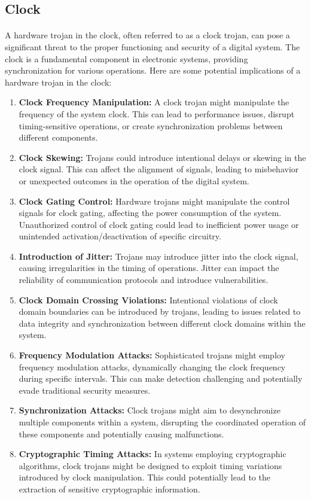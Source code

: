\subsection{Clock}
\paragraph*{}
A hardware trojan in the clock, often referred to as a clock trojan, can pose a significant threat to the proper functioning and security of a digital system. The clock is a fundamental component in electronic systems, providing synchronization for various operations. Here are some potential implications of a hardware trojan in the clock:
\begin{enumerate}
	\item \textbf{Clock Frequency Manipulation:} A clock trojan might manipulate the frequency of the system clock. This can lead to performance issues, disrupt timing-sensitive operations, or create synchronization problems between different components.
	\item \textbf{Clock Skewing:} Trojans could introduce intentional delays or skewing in the clock signal. This can affect the alignment of signals, leading to misbehavior or unexpected outcomes in the operation of the digital system.
	\item \textbf{Clock Gating Control:} Hardware trojans might manipulate the control signals for clock gating, affecting the power consumption of the system. Unauthorized control of clock gating could lead to inefficient power usage or unintended activation/deactivation of specific circuitry.
	\item \textbf{Introduction of Jitter:} Trojans may introduce jitter into the clock signal, causing irregularities in the timing of operations. Jitter can impact the reliability of communication protocols and introduce vulnerabilities.
	\item \textbf{Clock Domain Crossing Violations:} Intentional violations of clock domain boundaries can be introduced by trojans, leading to issues related to data integrity and synchronization between different clock domains within the system.
	\item \textbf{Frequency Modulation Attacks:} Sophisticated trojans might employ frequency modulation attacks, dynamically changing the clock frequency during specific intervals. This can make detection challenging and potentially evade traditional security measures.
	\item \textbf{Synchronization Attacks:} Clock trojans might aim to desynchronize multiple components within a system, disrupting the coordinated operation of these components and potentially causing malfunctions.
	\item \textbf{Cryptographic Timing Attacks:} In systems employing cryptographic algorithms, clock trojans might be designed to exploit timing variations introduced by clock manipulation. This could potentially lead to the extraction of sensitive cryptographic information.
\end{enumerate}

